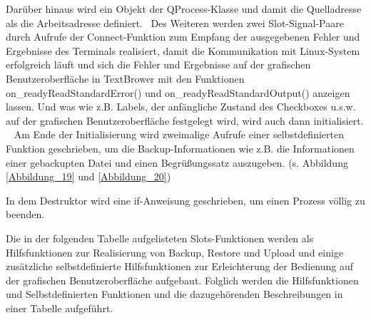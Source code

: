 Darüber hinaus wird ein Objekt der QProcess-Klasse und damit die Quelladresse als die Arbeitsadresse definiert.  Des Weiteren werden zwei Slot-Signal-Paare durch Aufrufe der Connect-Funktion zum Empfang der ausgegebenen Fehler und Ergebnisse des Terminals realisiert, damit die Kommunikation mit Linux-System erfolgreich läuft und sich die Fehler und Ergebnisse auf der grafischen Benutzeroberfläche in TextBrower mit den Funktionen on\_readyReadStandardError() und on\_readyReadStandardOutput() anzeigen lassen. Und was wie z.B. Labels, der anfängliche Zustand des Checkboxes u.s.w. auf der grafischen Benutzeroberfläche festgelegt wird, wird auch dann initialisiert.   Am Ende der Initialisierung wird zweimalige Aufrufe einer selbstdefinierten Funktion geschrieben, um die Backup-Informationen wie z.B. die Informationen einer gebackupten Datei und einen Begrüßungssatz auszugeben. (s. Abbildung \ref{Abbildung_19}  und \ref{Abbildung_20}) 
\par In dem Destruktor wird eine if-Anweisung geschrieben, um einen Prozess völlig zu beenden. 
\par Die in der folgenden Tabelle aufgelisteten Slots-Funktionen werden als Hilfsfunktionen zur Realisierung von Backup, Restore und Upload und einige zusätzliche selbstdefinierte Hilfsfunktionen zur Erleichterung der Bedienung auf der grafischen Benutzeroberfläche aufgebaut. Folglich werden die Hilfsfunktionen und Selbstdefinierten Funktionen und die dazugehörenden Beschreibungen in einer Tabelle aufgeführt.

